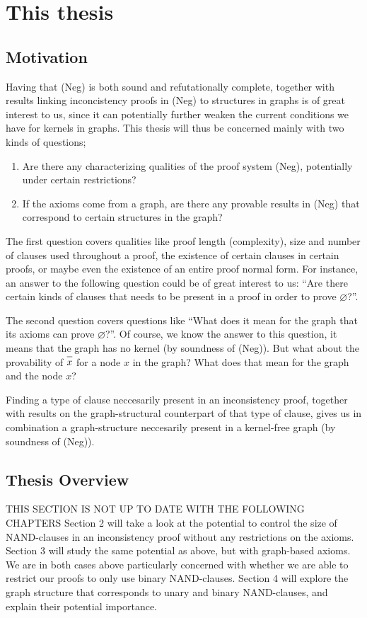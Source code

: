 \section{This thesis}
\label{sec:This thesis}
\subsection{Motivation}
\label{sub:Motivation}
Having that (Neg) is both sound and refutationally complete, together with results linking inconcistency proofs in (Neg) to structures in graphs is of great interest to us, since it can potentially further weaken the current conditions we have for kernels in graphs.
This thesis will thus be concerned mainly with two kinds of questions;
\begin{enumerate}
  \item Are there any characterizing qualities of the proof system (Neg), potentially under certain restrictions?
  \item If the axioms come from a graph, are there any provable results in (Neg) that correspond to certain structures in the graph?
\end{enumerate}
The first question covers qualities like proof length (complexity), size and number of clauses used throughout a proof, the existence of certain clauses in certain proofs, or maybe even the existence of an entire proof normal form.
For instance, an answer to the following question could be of great interest to us: ``Are there certain kinds of clauses that needs to be present in a proof in order to prove $\varnothing$?''.

The second question covers questions like ``What does it mean for the graph that its axioms can prove $\varnothing$?''.
Of course, we know the answer to this question, it means that the graph has no kernel (by soundness of (Neg)).
But what about the provability of $\ol{x}$ for a node $x$ in the graph?
What does that mean for the graph and the node $x$?

Finding a type of clause neccesarily present in an inconsistency proof, together with results on the graph-structural counterpart of that type of clause, gives us in combination a graph-structure neccesarily present in a kernel-free graph (by soundness of (Neg)).
\subsection{Thesis Overview}
\label{sub:Thesis Overview}
THIS SECTION IS NOT UP TO DATE WITH THE FOLLOWING CHAPTERS
Section 2 will take a look at the potential to control the size of NAND-clauses in an inconsistency proof without any restrictions on the axioms.
Section 3 will study the same potential as above, but with graph-based axioms.
We are in both cases above particularly concerned with whether we are able to restrict our proofs to only use binary NAND-clauses.
Section 4 will explore the graph structure that corresponds to unary and binary NAND-clauses, and explain their potential importance.
